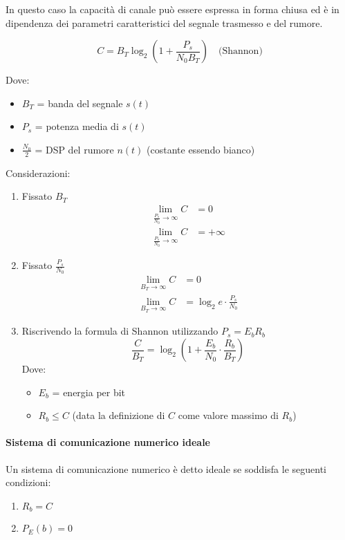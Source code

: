 In questo caso la capacità di canale può essere espressa in forma chiusa ed è in dipendenza dei parametri caratteristici del segnale trasmesso e del rumore.

\[
    C = B_T \log_2 \left( 1 + \frac{P_s}{N_0 B_T} \right) \quad \text{(Shannon)}
\]

Dove:
\begin{itemize}
    \item \( B_T \) = banda del segnale \( s(t) \)
    \item \( P_s \) = potenza media di \( s(t) \)
    \item \( \frac{N_0}{2} \) = DSP del rumore \( n(t) \) (costante essendo bianco)
\end{itemize}

Considerazioni:

\begin{enumerate}
    \item Fissato \( B_T \)
          \begin{align*}
              \lim_{\frac{P_s}{N_0} \to \infty} C & = 0       \\
              \lim_{\frac{P_s}{N_0} \to \infty} C & = +\infty
          \end{align*}

    \item Fissato \( \frac{P_s}{N_0} \)
          \begin{align*}
              \lim_{B_T \to \infty} C & = 0                              \\
              \lim_{B_T \to \infty} C & = \log_2 e \cdot \frac{P_s}{N_0}
          \end{align*}

    \item Riscrivendo la formula di Shannon utilizzando \( P_s = E_b R_b \)
          \[
              \frac{C}{B_T} = \log_2 \left( 1 + \frac{E_b}{N_0} \cdot \frac{R_b}{B_T} \right)
          \]
          Dove:
          \begin{itemize}
              \item \( E_b \) = energia per bit
              \item \( R_b \leq C \) (data la definizione di \( C \) come valore massimo di \( R_b \))
          \end{itemize}
\end{enumerate}

\paragraph*{Sistema di comunicazione numerico ideale}
Un sistema di comunicazione numerico è detto ideale se soddisfa le seguenti condizioni:
\begin{enumerate}
    \item \( R_b = C \)
    \item \( P_E(b) = 0 \)
\end{enumerate}

